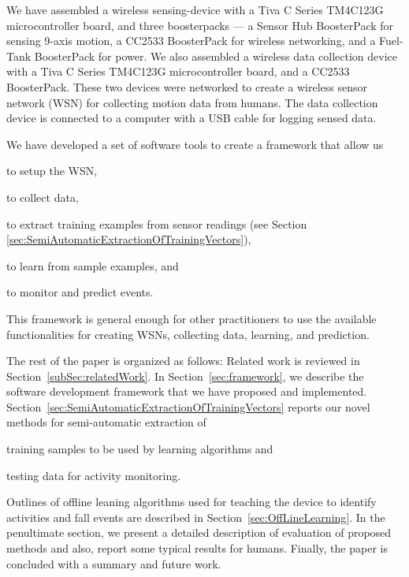 \documentclass[]{IEEEtran}
\begin{document}
We have assembled a wireless sensing-device with a Tiva C Series TM4C123G microcontroller board, and three 
boosterpacks --- a
Sensor Hub BoosterPack  for sensing 9-axis motion,  a CC2533  BoosterPack for wireless 
networking, and a Fuel-Tank BoosterPack for power. We also assembled a wireless data collection device with a Tiva C Series TM4C123G microcontroller board, and a  CC2533  BoosterPack. These two devices were networked to create a wireless sensor network (WSN) for 
collecting motion data from  humans.
The data collection device is connected to a computer with a USB cable for logging sensed data.   

We have developed a set of software tools to create a framework that allow us
\begin{inparaenum}[($i$)] \item  to setup the WSN, \item to collect data, \item to extract training examples from sensor readings (see Section \ref{sec:SemiAutomaticExtractionOfTrainingVectors}), \item to learn from sample examples, and \item 
to monitor and predict events. \end{inparaenum} This framework is general enough for other practitioners to use the
available functionalities for creating WSNs, collecting data, learning, and prediction.

The rest of the paper is organized as follows: Related work is reviewed in Section~\ref{subSec:relatedWork}. In Section~\ref{sec:framework}, we describe the software development 
framework that we have proposed and implemented.
Section~\ref{sec:SemiAutomaticExtractionOfTrainingVectors} reports our novel methods for  
semi-automatic extraction  of \begin{inparaenum} [($i$)] \item training samples to be 
used by  learning algorithms  and \item testing data for activity monitoring. 
\end{inparaenum} Outlines of offline leaning algorithms used for teaching the device to 
identify activities and fall events are described in Section~\ref{sec:OffLineLearning}. 
 In the penultimate section, we present a detailed description of evaluation of proposed methods and also, report some typical results for humans.
Finally, the paper is concluded with a summary and future work.  
\end{document}
